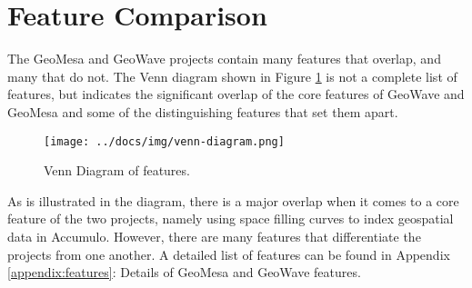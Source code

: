 \section{Feature Comparison}
\label{sec:featurecompare}

The GeoMesa and GeoWave projects contain many features that overlap, and many that do not.
The Venn diagram shown in Figure \ref{venn} is not a complete list of features,
but indicates the significant overlap of the core features of GeoWave and GeoMesa and some of the distinguishing features that set them apart.

\begin{figure}[h!tb]
  \centering
  \texttt{[image: ../docs/img/venn-diagram.png]}
  \caption{Venn Diagram of features.}
  \label{venn}
\end{figure}

As is illustrated in the diagram, there is a major overlap when it comes to a core feature of the two projects, namely using space filling curves to index geospatial data in Accumulo.
However, there are many features that differentiate the projects from one another.
A detailed list of features can be found in Appendix \ref{appendix:features}: Details of GeoMesa and GeoWave features.






